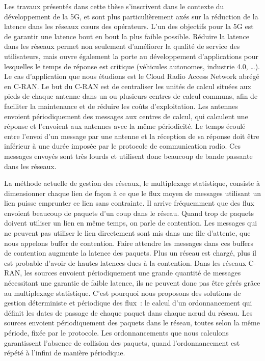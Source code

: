 
\label{chap:introfr}


Les travaux présentés dans cette thèse s'inscrivent dans le contexte du développement de la 5G, et sont plus particulièrement axés sur la réduction de la latence dans les réseaux cœurs des opérateurs.
L'un des objectifs pour la 5G est de garantir une latence bout en bout la plus faible possible.
Réduire la latence dans les réseaux permet non seulement d'améliorer la qualité de service des utilisateurs, mais ouvre également la porte au développement d'applications pour lesquelles le temps de réponse est critique (véhicules autonomes, industrie 4.0, \ldots).
Le cas d'application que nous étudions est le Cloud Radio Access Network abrégé en C-RAN. Le but du C-RAN est de centraliser les unités de calcul situées aux pieds de chaque antenne dans un ou plusieurs centres de calcul communs, afin de faciliter la maintenance et de réduire les coûts d'exploitation. Les antennes envoient périodiquement des messages aux centres de calcul, qui calculent une réponse et l'envoient aux antennes avec la même périodicité. Le temps écoulé entre l'envoi d'un message par une antenne et la réception de sa réponse doit être inférieur à une durée imposée par le protocole de communication radio. Ces messages envoyés sont très lourds et utilisent donc beaucoup de bande passante dans les réseaux.

La méthode actuelle de gestion des réseaux, le multiplexage statistique, consiste à dimensionner chaque lien de façon à ce que le flux moyen de messages utilisant un lien puisse emprunter ce lien sans contrainte. Il arrive fréquemment que des flux envoient beaucoup de paquets d'un coup dans le réseau. Quand trop de paquets doivent utiliser un lien en même temps, on parle de contention. Les messages qui ne peuvent pas utiliser le lien directement sont mis dans une file d'attente, que nous appelons buffer de contention. Faire attendre les messages dans ces buffers de contention augmente la latence des paquets. Plus un réseau est chargé, plus il est probable d'avoir de hautes latences dues à la contention. Dans les réseaux C-RAN, les sources envoient périodiquement une grande quantité de messages nécessitant une garantie de faible latence, ils ne peuvent donc pas être gérés grâce au multiplexage statistique. C'est pourquoi nous proposons des solutions de gestion déterministe et périodique des flux : le calcul d'un ordonnancement qui définit les dates de passage de chaque paquet dans chaque nœud du réseau. Les sources envoient périodiquement des paquets dans le réseau, toutes selon la même période, fixée par le protocole. Les ordonnancements que nous calculons garantissent l'absence de collision des paquets, quand l'ordonnancement est répété à l'infini de manière périodique.


